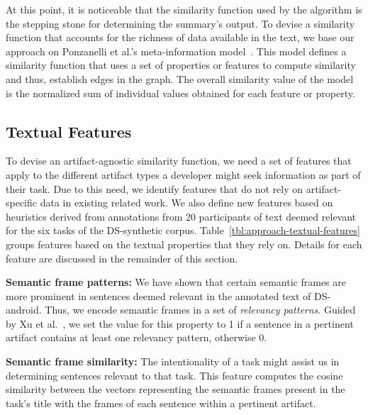 At this point, it is noticeable that the similarity function used by the algorithm is the stepping stone for determining the summary's output.  
To devise a similarity function that accounts for the richness of data available in the text, we base our approach on Ponzanelli et al.'s meta-information model~\cite{Ponzanelli2015}.
This model defines a similarity function that uses a set of properties or features to compute similarity and thus, establish edges in the graph.
The overall similarity value of the model is the normalized sum of individual values obtained for each feature or property.



\subsection{Textual Features}



To devise an artifact-agnostic similarity function, we need a set of features that apply to the different artifact types a developer might seek information as part of their task.
Due to this need, we identify features that do not rely on artifact-specific data in existing related work. 
We also define new features based 
on heuristics derived from annotations from 20 participants of text deemed relevant
for the six tasks of the \acs{DS-synthetic} corpus.
Table~\ref{tbl:approach-textual-features} groups features based on the textual properties that they rely on. Details for each feature are discussed in the remainder of this section.




\vspace{3mm}
\begin{hangparas}{1em}{1}
    \textbf{Semantic frame patterns:} We have shown that certain semantic frames are more prominent in sentences deemed relevant in the annotated text of \acs{DS-android}.
    Thus, we encode semantic frames in a set of \textit{relevancy patterns}. 
    Guided by Xu et al.~\cite{Xu2017}, we set the value for this property to 1 if a sentence in a pertinent artifact contains at least one relevancy pattern, otherwise 0.
\end{hangparas}


\vspace{3mm}
\begin{hangparas}{1em}{1}
    \textbf{Semantic frame similarity:} The intentionality of a task might assist us in determining sentences relevant to that task. 
    This feature computes the cosine similarity between the vectors representing the semantic frames present in the task's title with the frames of each sentence within a pertinent artifact. 
\end{hangparas}



